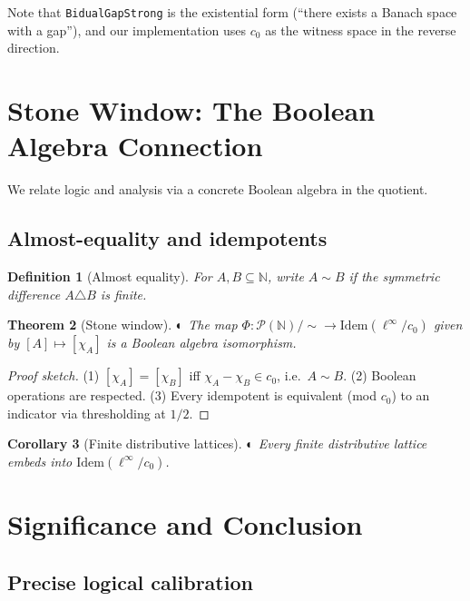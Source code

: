 \documentclass[11pt]{article}  %
\newtheorem{theorem}{Theorem}[section]
\newtheorem{corollary}[theorem]{Corollary}
\newtheorem{definition}[theorem]{Definition}
\newenvironment{thm}{\begin{theorem}}{\end{theorem}}
\newenvironment{cor}{\begin{corollary}}{\end{corollary}}
\newenvironment{defi}{\begin{definition}}{\end{definition}}
\newtheorem{theorem}{Theorem}[section]
\newtheorem{corollary}[theorem]{Corollary}
\newtheorem{definition}[theorem]{Definition}
\newenvironment{thm}{\begin{theorem}}{\end{theorem}}
\newenvironment{cor}{\begin{corollary}}{\end{corollary}}
\newenvironment{defi}{\begin{definition}}{\end{definition}}
\newcommand{\leanpartial}{\textsf{\small \textcolor{orange!80!black}{◐}}}
\newcommand{\N}{\mathbb{N}}
\newcommand{\linf}{\ell^\infty}
\newcommand{\cnull}{c_0}
\begin{document}
Note that \texttt{BidualGapStrong} is the existential form (``there exists a Banach space with a gap''), and our implementation uses $c_0$ as the witness space in the reverse direction.

\section{Stone Window: The Boolean Algebra Connection}\label{sec:stone}

We relate logic and analysis via a concrete Boolean algebra in the quotient.

\subsection{Almost-equality and idempotents}

\begin{defi}[Almost equality]
For $A,B\subseteq\N$, write $A\sim B$ if the symmetric difference $A\triangle B$ is finite.
\end{defi}

\begin{thm}[Stone window]\label{thm:stone}\leanpartial
The map $\Phi:\mathcal{P}(\N)/{\sim}\to \mathrm{Idem}(\linf/\cnull)$ given by $[A]\mapsto [\chi_A]$ is a Boolean algebra isomorphism.
\end{thm}

\begin{proof}[Proof sketch]
(1) $[\chi_A]=[\chi_B]$ iff $\chi_A-\chi_B\in \cnull$, i.e.\ $A\sim B$.  
(2) Boolean operations are respected.  
(3) Every idempotent is equivalent (mod $\cnull$) to an indicator via thresholding at $1/2$.
\end{proof}

\begin{cor}[Finite distributive lattices]\leanpartial
Every finite distributive lattice embeds into $\mathrm{Idem}(\linf/\cnull)$.
\end{cor}

\section{Significance and Conclusion}

\subsection{Precise logical calibration}
\end{document}
